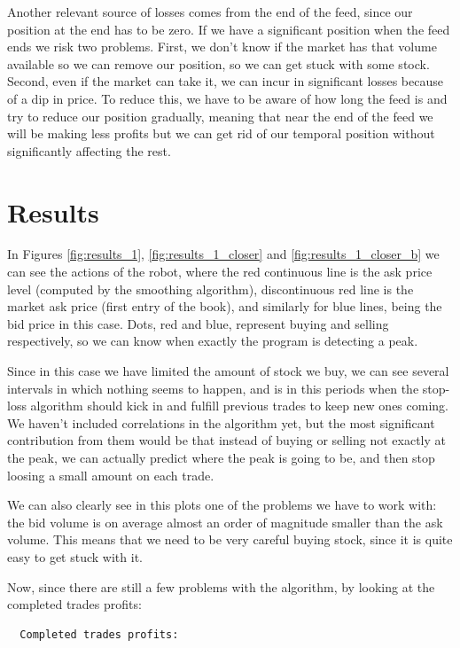 \documentclass[8 pt]{article}
\begin{document}
\begin{multicols*}{2}
  Another relevant source of losses comes from the end of the feed, since our position at the end has to be zero. If we have a significant position when the feed ends we risk two problems. First, we don't know if the market has that volume available so we can remove our position, so we can get stuck with some stock. Second, even if the market can take it, we can incur in significant losses because of a dip in price. To reduce this, we have to be aware of how long the feed is and try to reduce our position gradually, meaning that near the end of the feed we will be making less profits but we can get rid of our temporal position without significantly affecting the rest.

  \section{Results}

  In Figures \ref{fig:results_1}, \ref{fig:results_1_closer} and \ref{fig:results_1_closer_b} we can see the actions of the robot, where the red continuous line is the ask price level (computed by the smoothing algorithm), discontinuous red line is the market ask price (first entry of the book), and similarly for blue lines, being the bid price in this case. Dots, red and blue, represent buying and selling respectively, so we can know when exactly the program is detecting a peak.

  Since in this case we have limited the amount of stock we buy, we can see several intervals in which nothing seems to happen, and is in this periods when the stop-loss algorithm should kick in and fulfill previous trades to keep new ones coming. We haven't included correlations in the algorithm yet, but the most significant contribution from them would be that instead of buying or selling not exactly at the peak, we can actually predict where the peak is going to be, and then stop loosing a small amount on each trade.

  We can also clearly see in this plots one of the problems we have to work with: the bid volume is on average almost an order of magnitude smaller than the ask volume. This means that we need to be very careful buying stock, since it is quite easy to get stuck with it.

  Now, since there are still a few problems with the algorithm, by looking at the completed trades profits:

  \begin{verbatim}
  Completed trades profits:


\end{verbatim}
\end{multicols*}
\end{document}
